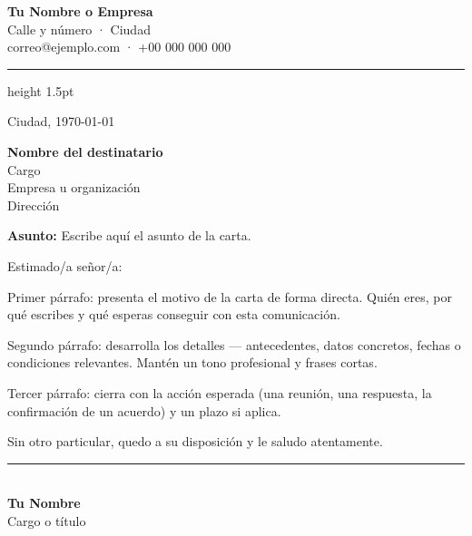 \documentclass[11pt,a4paper]{article}
\begin{document}
\begin{flushright}
  {\large\bfseries\color{membrete} Tu Nombre o Empresa}\\
  Calle y número · Ciudad\\
  correo@ejemplo.com · +00 000 000 000
\end{flushright}

{\color{membrete}\hrule height 1.5pt}
\vspace{1.2em}

\begin{flushright}
  Ciudad, \today
\end{flushright}

\textbf{Nombre del destinatario}\\
Cargo\\
Empresa u organización\\
Dirección

\vspace{1.2em}
\textbf{Asunto:} Escribe aquí el asunto de la carta.

\vspace{0.8em}
Estimado/a señor/a:

Primer párrafo: presenta el motivo de la carta de forma directa. Quién eres,
por qué escribes y qué esperas conseguir con esta comunicación.

Segundo párrafo: desarrolla los detalles — antecedentes, datos concretos,
fechas o condiciones relevantes. Mantén un tono profesional y frases cortas.

Tercer párrafo: cierra con la acción esperada (una reunión, una respuesta,
la confirmación de un acuerdo) y un plazo si aplica.

Sin otro particular, quedo a su disposición y le saludo atentamente.

\vspace{3em}
\rule{6cm}{0.4pt}\\
\textbf{Tu Nombre}\\
Cargo o título
\end{document}
